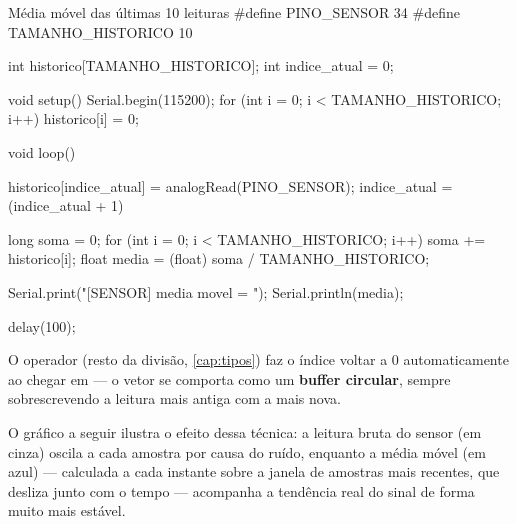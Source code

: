 \begin{codigoc}{Média móvel das últimas 10 leituras}
#define PINO_SENSOR 34
#define TAMANHO_HISTORICO 10

int historico[TAMANHO_HISTORICO];
int indice_atual = 0;

void setup() {
    Serial.begin(115200);
    for (int i = 0; i < TAMANHO_HISTORICO; i++) {
        historico[i] = 0;
    }
}

void loop() {
    historico[indice_atual] = analogRead(PINO_SENSOR);
    indice_atual = (indice_atual + 1) %

    long soma = 0;
    for (int i = 0; i < TAMANHO_HISTORICO; i++) {
        soma += historico[i];
    }
    float media = (float) soma / TAMANHO_HISTORICO;

    Serial.print("[SENSOR] media movel = ");
    Serial.println(media);

    delay(100);
}
\end{codigoc}

O operador \code{\%} (resto da divisão, \cref{cap:tipos}) faz o índice  voltar a 0 automaticamente ao chegar em  — o vetor se comporta como um \textbf{buffer circular}, sempre sobrescrevendo a leitura mais antiga com a mais nova.

O gráfico a seguir ilustra o efeito dessa técnica: a leitura bruta do sensor (em cinza) oscila a cada amostra por causa do ruído, enquanto a média móvel (em azul) — calculada a cada instante sobre a janela de amostras mais recentes, que desliza junto com o tempo — acompanha a tendência real do sinal de forma muito mais estável.

